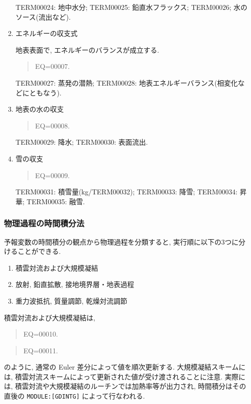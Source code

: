 \begin{enumerate}
TERM00024: 地中水分; 
TERM00025: 鉛直水フラックス;
TERM00026; 水のソース(流出など).

\item エネルギーの収支式

地表表面で, エネルギーのバランスが成立する.

\begin{quote}
EQ=00007.
\end{quote}

TERM00027: 蒸発の潜熱;
TERM00028: 地表エネルギーバランス(相変化などにともなう).

\item 地表の水の収支

\begin{quote}
EQ=00008.
\end{quote}

TERM00029: 降水;
TERM00030: 表面流出.

\item 雪の収支

\begin{quote}
EQ=00009.
\end{quote}

TERM00031: 積雪量(kg/TERM00032);
TERM00033: 降雪;
TERM00034: 昇華;
TERM00035: 融雪.

\end{enumerate}

\subsubsection{物理過程の時間積分法}

予報変数の時間積分の観点から物理過程を分類すると,
実行順に以下の3つに分けることができる.
\begin{enumerate}
\item 積雲対流および大規模凝結
\item 放射, 鉛直拡散, 接地境界層・地表過程       
\item 重力波抵抗, 質量調節, 乾燥対流調節
\end{enumerate}

積雲対流および大規模凝結は,
\begin{quote}
EQ=00010.
\end{quote}
\begin{quote}
EQ=00011.
\end{quote}
のように, 通常の Euler 差分によって値を順次更新する.
大規模凝結スキームには, 
積雲対流スキームによって更新された値が受け渡されることに注意.
実際には, 積雲対流や大規模凝結のルーチンでは加熱率等が出力され,
時間積分はその直後の \texttt{MODULE:[GDINTG]} によって行なわれる.


